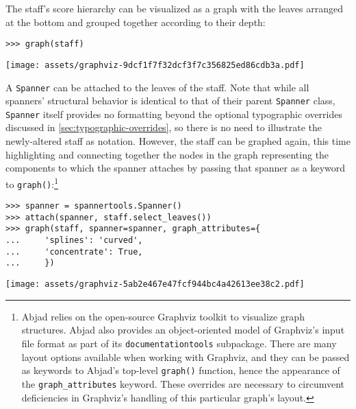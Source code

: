 \noindent The staff's score hierarchy can be visualized as a graph with the
leaves arranged at the bottom and grouped together according to their depth:

\begin{comment}
<abjad>
graph(staff)
</abjad>
\end{comment}

\begin{abjadbookoutput}
\begin{singlespacing}
\vspace{-0.5\baselineskip}
\begin{verbatim}
>>> graph(staff)
\end{verbatim}
\noindent\texttt{[image: assets/graphviz-9dcf1f7f32dcf3f7c356825ed86cdb3a.pdf]}
\end{singlespacing}
\end{abjadbookoutput}

\noindent A \texttt{Spanner} can be attached to the leaves of the staff. Note
that while all spanners' structural behavior is identical to that of their
parent \texttt{Spanner} class, \texttt{Spanner} itself provides no formatting
beyond the optional typographic overrides discussed in
\autoref{sec:typographic-overrides}, so there is no need to illustrate the
newly-altered staff as notation. However, the staff can be graphed again, this
time highlighting and connecting together the nodes in the graph representing
the components to which the spanner attaches by passing that spanner as a
keyword to \texttt{graph()}:\footnote{Abjad relies on the open-source Graphviz
toolkit to visualize graph structures. Abjad also provides an object-oriented
model of Graphviz's input file format as part of its
\texttt{documentationtools} subpackage. There are many layout options available
when working with Graphviz, and they can be passed as keywords to Abjad's
top-level \texttt{graph()} function, hence the appearance of the
\texttt{graph\_attributes} keyword. These overrides are necessary to circumvent
deficiencies in Graphviz's handling of this particular graph's layout.}

\begin{comment}
<abjad>
spanner = spannertools.Spanner()
attach(spanner, staff.select_leaves())
graph(staff, spanner=spanner, graph_attributes={
    'splines': 'curved',
    'concentrate': True,
    })
</abjad>
\end{comment}

\begin{abjadbookoutput}
\begin{singlespacing}
\vspace{-0.5\baselineskip}
\begin{verbatim}
>>> spanner = spannertools.Spanner()
>>> attach(spanner, staff.select_leaves())
>>> graph(staff, spanner=spanner, graph_attributes={
...     'splines': 'curved',
...     'concentrate': True,
...     })
\end{verbatim}
\noindent\texttt{[image: assets/graphviz-5ab2e467e47fcf944bc4a42613ee38c2.pdf]}
\end{singlespacing}
\end{abjadbookoutput}

